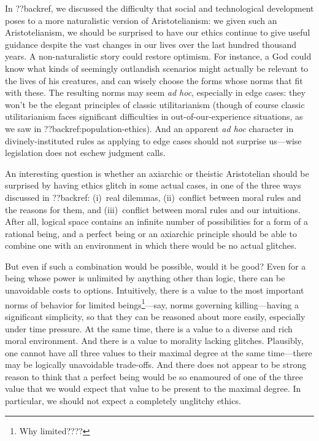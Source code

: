 In ??backref, we discussed the difficulty that social and technological development poses to a more naturalistic
version of Aristotelianism: we given such an Aristotelianism, we should be surprised to have our ethics continue
to give useful guidance despite the vast changes in our lives over the last hundred thousand years. 
A non-naturalistic story could restore optimism. For instance, a God could 
know what kinds of seemingly outlandish scenarios might
actually be relevant to the lives of his creatures, and can wisely choose the forms whose norms that fit with these. The resulting norms may 
seem \textit{ad hoc}, especially in edge cases: they won't be the elegant principles of classic utilitarianism (though of course classic utilitarianism
faces significant difficulties in out-of-our-experience situations, as we saw in ??backref:population-ethics). And an apparent
\textit{ad hoc} character in divinely-instituted rules as applying to edge cases should not surprise us---wise legislation does not eschew 
judgment calls.

An interesting question is whether an axiarchic or theistic Aristotelian should be surprised by having ethics glitch in some actual cases, in one of 
the three ways discussed in ??backref: (i)~real dilemmas, (ii)~conflict between moral rules and the reasons for them, and (iii)~conflict between
moral rules and our intuitions. After all, logical space contains an infinite number of possibilities for a form of a rational 
being, and a perfect being or an axiarchic principle should be able to combine one with an environment in which there would be no actual glitches. 

But even if such a combination would be possible, would it be good? Even for a being
whose power is unlimited by anything other than logic, there can be unavoidable costs to options. Intuitively, there is a value to
the most important norms of behavior for limited beings\footnote{Why limited????}---say, norms governing killing---having a significant simplicity, so that
they can be reasoned about more easily, especially under time pressure.  At the same
time, there is a value to a diverse and rich moral environment. And there is a value to morality lacking glitches. Plausibly,
one cannot have all three values to their maximal degree at the same time---there may be logically unavoidable trade-offs. 
And there does not appear to be strong reason to think that a perfect being would be so enamoured of one of the three value that
we would expect that value to be present to the maximal degree. In particular, we should not expect a completely unglitchy ethics.

